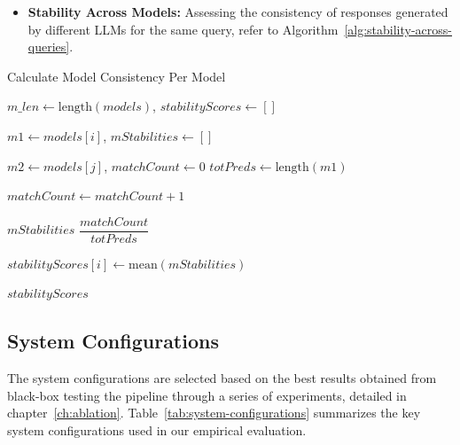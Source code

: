 \begin{itemize}
    \item \textbf{Stability Across Models:} Assessing the consistency of responses generated by different LLMs for the same query, refer to Algorithm~\ref{alg:stability-across-queries}.
\end{itemize}
\begin{algorithm}
    \caption{Calculate Model Consistency Per Model}
    \begin{algorithmic}[1]
         
            \State $m\_len \gets \text{length}(models)$, $stabilityScores \gets []$

                \State $m1 \gets models[i]$, $mStabilities \gets []$

                        \State $m2 \gets models[j]$, $matchCount \gets 0$
                        \State $totPreds \gets \text{length}(m1)$

                                \State $matchCount \gets matchCount + 1$
                            \EndIf
                        \EndFor

                        \State $mStabilities$ \gets $\dfrac{matchCount}{totPreds}$ 
                    \EndIf
                \EndFor

                \State $stabilityScores[i] \gets \text{mean}(mStabilities)$
            \EndFor

            \State \Return $stabilityScores$ 
        \EndProcedure
    \end{algorithmic}
    \label{alg:stability-across-queries}
\end{algorithm}

\subsection{System Configurations}\label{subsec:empirical-evaluation:experimental-setup:system-configurations}
The system configurations are selected based on the best results obtained from black-box testing the pipeline through a series of experiments, detailed in chapter~\ref{ch:ablation}.
Table~\ref{tab:system-configurations} summarizes the key system configurations used in our empirical evaluation.

